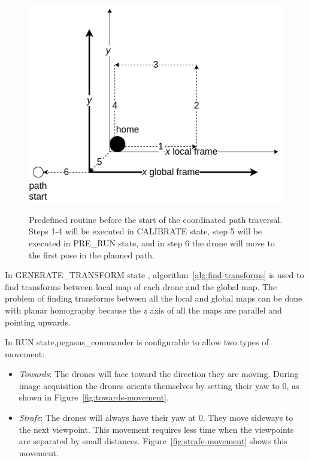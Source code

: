 \begin{figure}
	\centering
	\caption[Predefined routine before the start of the coordinated path traversal]{\small Predefined routine before the start of the coordinated path traversal. Steps 1-4 will be executed in CALIBRATE state, step 5 will be executed in PRE\_RUN state, and in step 6 the drone will move to the first pose in the planned path.} 
	\includegraphics[width=5in]{figures/methodology/methodology-calibration-routine}
	\label{fig:calibration-routine}
\end{figure}

In GENERATE\_TRANSFORM state , algorithm~\ref{alg:find-transforms} is used to find transforms between local map of each drone and the global map. The problem of finding transforms between all the local and global maps can be done with planar homography because the z axis of all the maps are parallel and pointing upwards.

In RUN state,pegasus\_commander is configurable to allow two types of movement:
\begin{itemize}
	\item \textit{Towards}: The drones will face toward the direction they are moving. During image acquisition the drones orients themselves by setting their yaw to 0\degree, as shown in Figure~\ref{fig:towards-movement}.
	\item \textit{Strafe}: The drones will always have their yaw at 0\degree. They move sideways to the next viewpoint. This movement requires less time when the viewpoints are separated by small distances. Figure~\ref{fig:strafe-movement} shows this movement.
\end{itemize}

